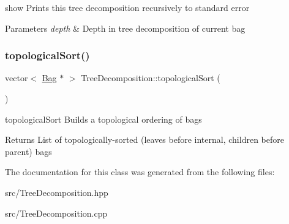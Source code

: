 show Prints this tree decomposition recursively to standard error 


\begin{DoxyParams}{Parameters}
{\em depth} & Depth in tree decomposition of current bag \\
\hline
\end{DoxyParams}
\mbox{\label{class_tree_decomposition_a204777cf6460de25bc733a2fff4fb38c}} 
\subsubsection{\texorpdfstring{topological\+Sort()}{topologicalSort()}}
{\footnotesize\ttfamily vector$<$ \hyperlink{class_bag}{Bag} $\ast$ $>$ Tree\+Decomposition\+::topological\+Sort (\begin{DoxyParamCaption}{ }\end{DoxyParamCaption})}



topological\+Sort Builds a topological ordering of bags 

\begin{DoxyReturn}{Returns}
List of topologically-\/sorted (leaves before internal, children before parent) bags 
\end{DoxyReturn}


The documentation for this class was generated from the following files\+:\begin{DoxyCompactItemize}
\item 
src/Tree\+Decomposition.\+hpp\item 
src/Tree\+Decomposition.\+cpp\end{DoxyCompactItemize}
